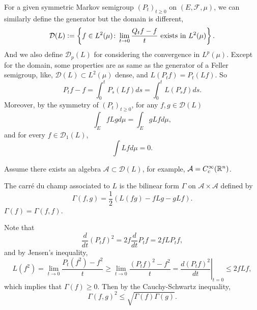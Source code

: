 For a given symmetric Markov semigroup $(P_t)_{t \geq 0}$ on $(E, \mathcal{F},\mu)$, we can similarly define the generator but the domain is different,
\begin{equation*}
	\mathcal{D}(L) \vcentcolon= \left\{f \in L^2(\mu)\colon \lim_{t \rightarrow 0} \frac{Q_tf - f}{t} \text{ exists in } L^2(\mu)\right\}.
\end{equation*}
And we also define $\mathcal{D}_p(L)$ for considering the convergence in $L^p(\mu)$. Except for the domain, some properties are as same as the generator of a Feller semigroup, like, $\mathcal{D}(L) \subset L^2(\mu)$ dense, and $L(P_t f) = P_t (L f)$. So
\begin{equation*}
	P_t f - f = \int_0^t P_s(Lf)ds = \int_0^t L(P_s f)ds.
\end{equation*}
Moreover, by the symmetry of $(P_t)_{t \geq 0}$, for any $f,g \in \mathcal{D}(L)$
\begin{equation*}
	\int_E f L g d \mu=\int_E g L f d \mu,
\end{equation*}
and for every $f \in \mathcal{D}_1(L)$,
\begin{equation*}
	\int L f d \mu=0.
\end{equation*}

\noindent Assume there exists an algebra $\mathcal{A} \subset \mathcal{D}(L)$, for example, $\mathcal{A} = C_c^\infty(\mathbb{R}^n)$.

\begin{defn}
    The carr\'e du champ associated to $L$ is the bilinear form $\Gamma$ on $\mathcal{A} \times \mathcal{A}$ defined by
    \begin{equation*}
    	\Gamma(f, g)=\frac{1}{2}(L(f g)-f L g-g L f).
    \end{equation*}
    $\Gamma(f) = \Gamma(f,f)$.
\end{defn}

Note that
\begin{equation*}
	\frac{d}{d t}\left(P_t f\right)^2=2 f \frac{d}{d t} P_t f=2 f L P_t f,
\end{equation*}
and by Jensen's inequality,
\begin{equation*}
	L\left(f^2\right)=\lim _{t \rightarrow 0} \frac{P_t\left(f^2\right)-f^2}{t} \geq \lim _{t \rightarrow 0} \frac{\left(P_t f\right)^2-f^2}{t}=\left.\frac{d\left(P_t f\right)^2}{d t}\right|_{t=0} \leq 2f Lf,
\end{equation*}
which implies that $\Gamma(f) \geq 0$. Then by the Cauchy-Schwartz inequality,
\begin{equation*}
	\Gamma(f,g)^2 \leq \sqrt{\Gamma(f)\Gamma(g)}.
\end{equation*}

